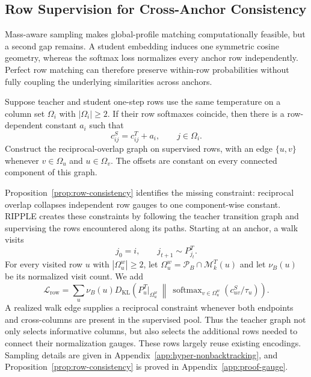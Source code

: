 \subsection{Row Supervision for Cross-Anchor Consistency}
\label{sec:walk}

Mass-aware sampling makes global-profile matching computationally feasible, but a second gap remains. A student embedding induces one symmetric cosine geometry, whereas the softmax loss normalizes every anchor row independently. Perfect row matching can therefore preserve within-row probabilities without fully coupling the underlying similarities across anchors.

\begin{proposition}
\label{prop:row-consistency}
Suppose teacher and student one-step rows use the same temperature on a column set $\Omega_i$ with $|\Omega_i|\geq2$. If their row softmaxes coincide, then there is a row-dependent constant $a_i$ such that
\begin{equation}
\label{eq:row-gauge}
c^S_{ij}=c^T_{ij}+a_i,
\qquad j\in\Omega_i.
\end{equation}
Construct the reciprocal-overlap graph on supervised rows, with an edge $\{u,v\}$ whenever $v\in\Omega_u$ and $u\in\Omega_v$. The offsets are constant on every connected component of this graph.
\end{proposition}

Proposition~\ref{prop:row-consistency} identifies the missing constraint: reciprocal overlap collapses independent row gauges to one component-wise constant. RIPPLE creates these constraints by following the teacher transition graph and supervising the rows encountered along its paths. Starting at an anchor, a walk visits
\begin{equation}
\label{eq:walk}
j_0=i,
\qquad
j_{t+1}\sim P^T_{j_t}.
\end{equation}
For every visited row $u$ with $|\Omega_u^w|\geq2$, let $\Omega_u^w=\mathcal P_B\cap\mathcal M_k^T(u)$ and let $\nu_B(u)$ be its normalized visit count. We add
\begin{equation}
\label{eq:lrow}
\mathcal L_{\mathrm{row}}
=\sum_u\nu_B(u)
D_{\mathrm{KL}}\!\left(
P_u^T|_{\Omega_u^w}\ \middle\|\
\operatorname{softmax}_{v\in\Omega_u^w}(c^S_{uv}/\tau_u)
\right).
\end{equation}
A realized walk edge supplies a reciprocal constraint whenever both endpoints and cross-columns are present in the supervised pool. Thus the teacher graph not only selects informative columns, but also selects the additional rows needed to connect their normalization gauges. These rows largely reuse existing encodings. Sampling details are given in Appendix~\ref{app:hyper-nonbacktracking}, and Proposition~\ref{prop:row-consistency} is proved in Appendix~\ref{app:proof-gauge}.

